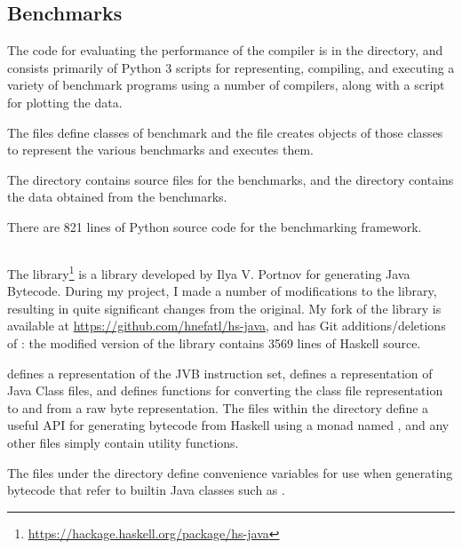 \documentclass[dissertation.tex]{subfiles}
\begin{document}
{    \subsection{Benchmarks}
    {
        The code for evaluating the performance of the compiler is in the  directory, and consists primarily of Python 3 scripts for representing, compiling, and executing a variety of benchmark programs using a number of compilers, along with a script for plotting the data.

        The  files define classes of benchmark and the  file creates objects of those classes to represent the various benchmarks and executes them.

        The  directory contains source files for the benchmarks, and the  directory contains the data obtained from the benchmarks.

        There are 821 lines of Python source code for the benchmarking framework.
    }
    \subsection{}
    {
        The  library\footnote{\url{https://hackage.haskell.org/package/hs-java}} is a library developed by Ilya V. Portnov for generating Java Bytecode. During my project, I made a number of modifications to the library, resulting in quite significant changes from the original. My fork of the library is available at \url{https://github.com/hnefatl/hs-java}, and has Git additions/deletions of : the modified version of the library contains 3569 lines of Haskell source.

         defines a representation of the JVB instruction set,  defines a representation of Java Class files, and  defines functions for converting the class file representation to and from a raw byte representation. The files within the  directory define a useful API for generating bytecode from Haskell using a monad named , and any other files simply contain utility functions.

        The files under the  directory define convenience variables for use when generating bytecode that refer to builtin Java classes such as .
    }
}
\end{document}
